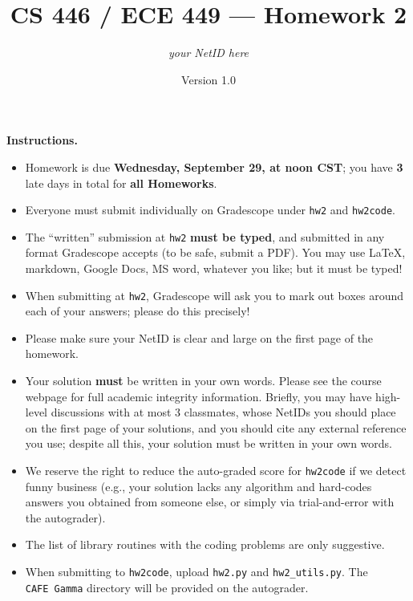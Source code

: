 \documentclass{article}
\title{CS 446 / ECE 449 --- Homework 2}
\author{\emph{your NetID here}}
\date{Version 1.0}
\theoremstyle{definition}
\theoremstyle{remark}
\begin{document}
\maketitle

\noindent\textbf{Instructions.}
\begin{itemize}
    \item
    Homework is due \textbf{Wednesday, September 29, at noon CST}; you have \textbf{3} late days in total for \textbf{all Homeworks}.
    
    \item
    Everyone must submit individually on Gradescope under \texttt{hw2} and \texttt{hw2code}.
    
    \item
    The ``written'' submission at \texttt{hw2} \textbf{must be typed}, and submitted in
    any format Gradescope accepts (to be safe, submit a PDF).  You may use \LaTeX, markdown,
    Google Docs, MS word, whatever you like; but it must be typed!
    
    \item
    When submitting at \texttt{hw2}, Gradescope will ask you to mark out boxes
    around each of your answers; please do this precisely!
    
    \item
    Please make sure your NetID is clear and large on the first page of the homework.
    
    \item
    Your solution \textbf{must} be written in your own words.
    Please see the course webpage for full academic integrity information.
    Briefly, you may have high-level discussions with at most 3 classmates,
    whose NetIDs you should place on the first page of your solutions,
    and you should cite any external reference you use; despite all this,
    your solution must be written in your own words.
    
    \item
    We reserve the right to reduce the auto-graded score for
    \texttt{hw2code} if we detect funny business (e.g., your solution
    lacks any algorithm and hard-codes answers you obtained from
    someone else, or simply via trial-and-error with the autograder).
    
    \item The list of library routines with the coding problems are only suggestive.
    
    \item
    When submitting to \texttt{hw2code}, upload \texttt{hw2.py} and \texttt{hw2\_utils.py}. The \texttt{CAFE\ Gamma} directory will be provided on the autograder.
\end{itemize}
\end{document}
